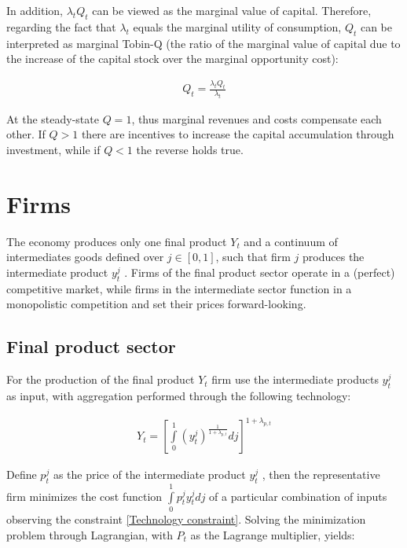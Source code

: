 \documentclass{pracamgr}
\numberwithin{equation}{section}
\begin{document}
In addition, $\lambda_{t} Q_{t}$ can be viewed as the marginal value of capital. Therefore, regarding the fact that $\lambda_{t}$ equals the marginal utility of consumption, $Q_{t}$ can be interpreted as marginal Tobin-Q (the ratio of the marginal value of capital due to the increase of the capital stock over the marginal opportunity cost):

\begin{align}
Q_{t} = \frac{\lambda_{t} Q_{t}}{\lambda_{t}}
\end{align}

At the steady-state $Q=1$, thus marginal revenues and costs compensate each other. If $Q>1$ there are incentives to increase the capital accumulation through investment, while if $Q<1$ the reverse holds true.

\section{Firms} \label{DSGE - Firms}

The economy produces only one final product $Y_{t}$ and a continuum of intermediates goods defined over $j \in [0,1]$, such that firm $j$ produces the intermediate product $y_{t}^{j}$ . Firms of the final product sector operate in a (perfect) competitive market, while firms in the intermediate sector function in a monopolistic competition and set their prices forward-looking.

\subsection{Final product sector} \label{DSGE - Firms- Final product sector}

For the production of the final product $Y_{t}$ firm use the intermediate products $y_{t}^{j}$ as input, with aggregation performed through the following technology:

\begin{align} \label{Technology constraint}
Y_{t} = \left[ \int\limits_{0}^{1} \left(y_{t}^{j} \right)^\frac{1}{1+\lambda_{p,t}} dj \right]^{1+\lambda_{p,t}}
\end{align}

Define $p_{t}^{j}$ as the price of the intermediate product $y_{t}^{j}$ , then the representative firm minimizes the cost function $\int\limits_{0}^{1} p_{t}^{j} y_{t}^{j}dj$ of a particular combination of inputs observing the constraint \ref{Technology constraint}. Solving the minimization problem through Lagrangian, with $P_{t}$ as the Lagrange multiplier, yields:
\end{document}
